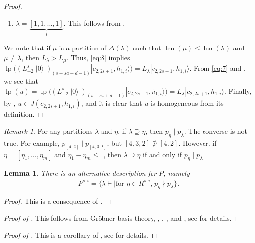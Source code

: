 \documentclass[a4paper, 12pt, reqno]{amsart}
\newtheorem{lemma}[theorem]{Lemma}
\theoremstyle{remark}
\newtheorem{remark}[theorem]{Remark}
\DeclareMathOperator{\len}{len}
\DeclareMathOperator{\vac}{|0\rangle}
\DeclareMathOperator{\lp}{lp}
\begin{document}
\begin{proof}
\begin{enumerate}
\begin{description}[leftmargin = !]
      Since $\binom{s - 1}{d - 1} + \binom{s - 1}{d} = \binom{s}{d}$, we obtain \eqref{eq:8}.
    \end{description}
  \item $\lambda = \underbrace{[1, 1, \dots, 1]}_i$.
    This follows from \cite{benoit_degenerate_1988}.
  \end{enumerate}
  We note that if $\mu$ is a partition of $\Delta(\lambda)$ such that $\len(\mu) \le \len(\lambda)$ and $\mu \neq \lambda$, then $L_{\lambda} > L_{\mu}$.
  Thus, \eqref{eq:8} implies $\lp((L_{-2}^s\vac)_{(s - sa + d - 1)}|c_{2, 2s + 1}, h_{1, i}\rangle) = L_{\lambda}|c_{2, 2s + 1}, h_{1, i}\rangle$.
  From \eqref{eq:7} and , we see that $\lp(u) = \lp((L_{-2}^s\vac)_{(s - sa + d - 1)}|c_{2, 2s + 1}, h_{1, i}\rangle) = L_{\lambda}|c_{2, 2s + 1}, h_{1, i}\rangle$.
  Finally, by , $u \in J(c_{2, 2s + 1}, h_{1, i})$, and it is clear that $u$ is homogeneous from its definition.
\end{proof}

\begin{remark}
  \label{rmk:5}
  For any partitions $\lambda$ and $\eta$, if $\lambda \supseteq \eta$, then $p_{\eta} \mid p_{\lambda}$.
  The converse is not true.
  For example, $p_{[4, 2]} \mid p_{[4, 3, 2]}$, but $[4, 3, 2] \nsupseteq [4, 2]$.
  However, if $\eta = [\eta_1, \dots, \eta_m]$ and $\eta_1 - \eta_m \le 1$, then $\lambda \supseteq \eta$ if and only if $p_{\eta} \mid p_{\lambda}$.
\end{remark}

\begin{lemma}
  \label{lmm:12}
  There is an alternative description for $P$, namely
  \begin{equation*}
    P^{s, i} = \{\lambda \vdash \mid \text{for $\eta \in R^{s, i}$, $p_{\eta} \nmid p_{\lambda}$}\}.
  \end{equation*}
\end{lemma}

\begin{proof}
  This is a consequence of .
\end{proof}

\begin{proof}[Proof of ]
  This follows from Gröbner basis theory, , , ,  and , see \cite{salazar_pbw_2024} for details.
\end{proof}

\begin{proof}[Proof of ]
  This is a corollary of , see \cite{salazar_pbw_2024} for details.
\end{proof}
\end{document}
